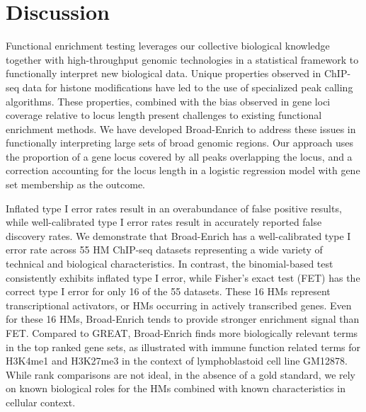 \section{Discussion}
\label{broadenrich_discussion}

Functional enrichment testing leverages our collective biological knowledge together with high-throughput genomic technologies in a statistical framework to functionally interpret new biological data. Unique properties observed in ChIP-seq data for histone modifications have led to the use of specialized peak calling algorithms. These properties, combined with the bias observed in gene loci coverage relative to locus length present challenges to existing functional enrichment methods. We have developed Broad-Enrich to address these issues in functionally interpreting large sets of broad genomic regions. Our approach uses the proportion of a gene locus covered by all peaks overlapping the locus, and a correction accounting for the locus length in a logistic regression model with gene set membership as the outcome.

Inflated type I error rates result in an overabundance of false positive results, while well-calibrated type I error rates result in accurately reported false discovery rates. We demonstrate that Broad-Enrich has a well-calibrated type I error rate across 55 HM ChIP-seq datasets representing a wide variety of technical and biological characteristics. In contrast, the binomial-based test consistently exhibits inflated type I error, while Fisher’s exact test (FET) has the correct type I error for only 16 of the 55 datasets. These 16 HMs represent transcriptional activators, or HMs occurring in actively transcribed genes. Even for these 16 HMs, Broad-Enrich tends to provide stronger enrichment signal than FET. Compared to GREAT, Broad-Enrich finds more biologically relevant terms in the top ranked gene sets, as illustrated with immune function related terms for  H3K4me1 and H3K27me3 in the context of lymphoblastoid cell line GM12878. While rank comparisons are not ideal, in the absence of a gold standard, we rely on known biological roles for the HMs combined with known characteristics in cellular context.


